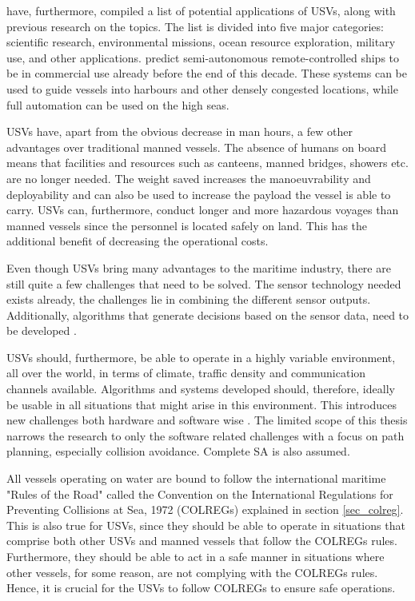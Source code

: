 \textcite{liu2016unmanned} have, furthermore, compiled a list of potential applications of USVs, along with previous research on the topics.
The list is divided into five major categories: scientific research, environmental missions, ocean resource exploration, military use, and other applications.
\textcite{jokioinen2016remote} predict semi-autonomous remote-controlled ships to be in commercial use already before the end of this decade. These systems can be used to guide vessels into harbours and other densely congested locations, while full automation can be used on the high seas.

USVs have, apart from the obvious decrease in man hours, a few other advantages over traditional manned vessels. The absence of humans on board means that facilities and resources such as canteens,  manned bridges, showers etc. are no longer needed. The weight saved increases the manoeuvrability and deployability and can also be used to increase the payload the vessel is able to carry. USVs can, furthermore, conduct longer and more hazardous voyages than manned vessels since the personnel is located safely on land. This has the additional benefit of decreasing the operational costs\cite{liu2016unmanned,jokioinen2016remote}.



Even though USVs bring many advantages to the maritime industry, there are still quite a few challenges that need to be solved. The sensor technology needed exists already, the challenges lie in combining the different sensor outputs. Additionally, algorithms that generate decisions based on the sensor data, need to be developed \cite{jokioinen2016remote}.

USVs should, furthermore, be able to operate in a highly variable environment, all over the world, in terms of climate, traffic density and communication channels available.  Algorithms and systems developed should, therefore, ideally be usable in all situations that might arise in this environment. This introduces new challenges both hardware and software wise \cite{liu2016unmanned}. The limited scope of this thesis narrows the research to only the software related challenges with a focus on path planning, especially collision avoidance. Complete SA is also assumed.

All vessels operating on water are bound to follow the international maritime "Rules of the Road" called the Convention on the International Regulations for Preventing Collisions at Sea, 1972 (COLREGs) explained in section \ref{sec_colreg}. This is also true for USVs, since they should be able to operate in situations that comprise both other USVs and manned vessels that follow the COLREGs rules. Furthermore, they should be able to  act in a safe manner in situations where other vessels, for some reason, are not complying with the COLREGs rules. Hence, it is crucial for the USVs to follow COLREGs to ensure safe operations.

